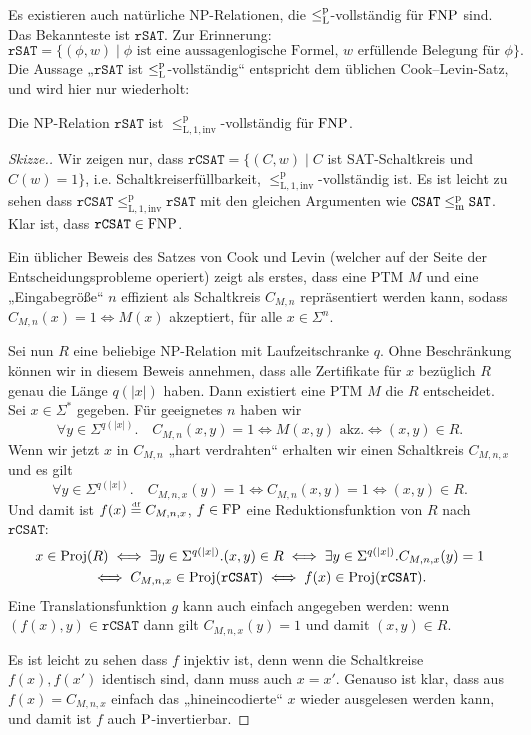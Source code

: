 Es existieren auch natürliche NP-Relationen, die $\leqlp$-vollständig für $\FNP$ sind.
Das Bekannteste ist $\mathtt{rSAT}$. Zur Erinnerung:
\[ \mathtt{rSAT} = \{ (\phi, w) \mid \text{$\phi$ ist eine aussagenlogische Formel, $w$ erfüllende Belegung für $\phi$} \}. \]
Die Aussage „$\mathtt{rSAT}$ ist $\leqlp$-vollständig“ entspricht dem üblichen Cook–Levin-Satz, und wird hier nur wiederholt:
\begin{theorem}
    Die NP-Relation $\mathtt{rSAT}$ ist $\leq_\mathrm{L,1,inv}^\mathrm p$-vollständig für $\FNP$.
\end{theorem}
\begin{proof}[Skizze.]
    Wir zeigen nur, dass $\mathtt{rCSAT}=\{(C, w) \mid C$ ist SAT-Schaltkreis und $C(w)=1\}$, i.e. Schaltkreiserfüllbarkeit, $\leq_\mathrm{L,1,inv}^\mathrm p$-vollständig ist. Es ist leicht zu sehen dass $\mathtt{rCSAT}\leq_\mathrm{L,1,inv}^\mathrm p \mathtt{rSAT}$ mit den gleichen Argumenten wie $\mathtt{CSAT}\leqmp \mathtt{SAT}$. Klar ist, dass $\mathtt{rCSAT}\in\FNP$.

    Ein üblicher Beweis des Satzes von Cook und Levin (welcher auf der Seite der Entscheidungsprobleme operiert) zeigt als erstes, dass eine PTM $M$ und eine „Eingabegröße“ $n$ effizient als Schaltkreis $C_{M,n}$ repräsentiert werden kann, sodass $C_{M,n}(x)=1 \iff M(x)$ akzeptiert, für alle $x\in\Sigma^{n}$.

    Sei nun $R$ eine beliebige NP-Relation mit Laufzeitschranke $q$. Ohne Beschränkung können wir in diesem Beweis annehmen, dass alle Zertifikate für $x$ bezüglich $R$ genau die Länge $q(|x|)$ haben. Dann existiert eine PTM $M$ die $R$ entscheidet. Sei $x\in\Sigma^*$ gegeben. Für geeignetes $n$ haben wir
    \[ \forall y\in\Sigma^{q(|x|)}.\quad C_{M,n}(x,y)=1 \iff M(x,y)\text{ akz.} \iff (x,y)\in R. \]
    Wenn wir jetzt $x$ in $C_{M,n}$ „hart verdrahten“ erhalten wir einen Schaltkreis $C_{M,n,x}$ und es gilt
    \[ \forall y\in\Sigma^{q(|x|)}.\quad C_{M,n,x}(y)=1 \iff C_{M,n}(x,y)=1 \iff (x,y)\in R. \]
    Und damit ist $f(x) \defeq C_{M,n,x}$, $f\in\FP$ eine Reduktionsfunktion von $R$ nach $\mathtt{rCSAT}$:
    \begin{gather*}
    x\in \Proj(R) \iff \exists  y\in\Sigma^{q(|x|)}.(x,y)\in R \iff \exists y\in\Sigma^{q(|x|)}.C_{M,n,x}(y)=1 \\\iff C_{M,n,x}\in\Proj(\mathtt{rCSAT}) \iff f(x)\in\Proj(\mathtt{rCSAT}). \end{gather*}
    Eine Translationsfunktion $g$ kann auch einfach angegeben werden: wenn $(f(x), y)\in \mathtt{rCSAT}$ dann gilt $C_{M,n,x}(y)=1$ und damit  $(x,y)\in R$.

    Es ist leicht zu sehen dass $f$ injektiv ist, denn wenn die Schaltkreise $f(x), f(x')$ identisch sind, dann muss auch $x=x'$. Genauso ist klar, dass aus $f(x)=C_{M,n,x}$ einfach das „hineincodierte“ $x$ wieder ausgelesen werden kann, und damit ist $f$ auch $\P$-invertierbar.
\end{proof}

